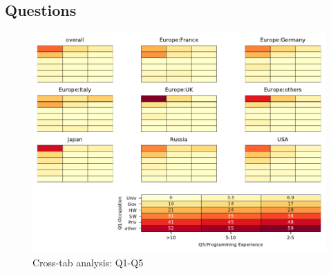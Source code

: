 
\subsection{Questions}


\begin{figure}
\begin{center}
\includegraphics[width=12cm]{../pdfs/Q1-Q5.pdf}
\caption{Cross-tab analysis: Q1-Q5}
\label{fig:Q1-Q5}
\end{center}
\end{figure}
